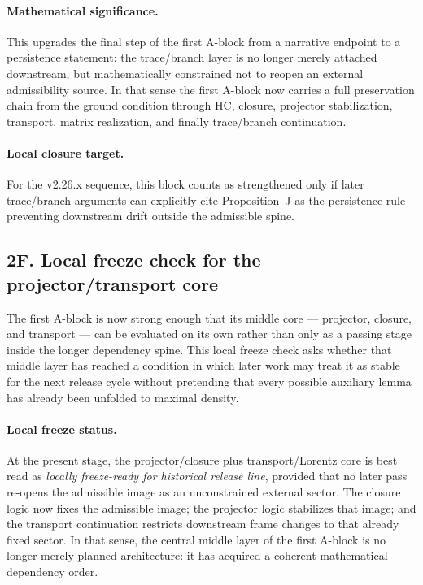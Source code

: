 \documentclass[12pt,a4paper]{article}
\DeclareRobustCommand{\QSCver}[1]{archival stage}
\renewcommand{\QSCver}[1]{historical release line}
\begin{document}
\paragraph{Mathematical significance.}
This upgrades the final step of the first A-block from a narrative endpoint to a persistence statement: the trace/branch layer is no longer merely attached downstream, but mathematically constrained not to reopen an external admissibility source. In that sense the first A-block now carries a full preservation chain from the ground condition through HC, closure, projector stabilization, transport, matrix realization, and finally trace/branch continuation.

\paragraph{Local closure target.}
For the v2.26.x sequence, this block counts as strengthened only if later trace/branch arguments can explicitly cite Proposition~J as the persistence rule preventing downstream drift outside the admissible spine.

\subsection*{2F. Local freeze check for the projector/transport core}
The first A-block is now strong enough that its middle core --- projector,
closure, and transport --- can be evaluated on its own rather than only as a
passing stage inside the longer dependency spine. This local freeze check asks
whether that middle layer has reached a condition in which later work may treat
it as stable for the next release cycle without pretending that every possible
auxiliary lemma has already been unfolded to maximal density.

\paragraph{Local freeze status.}
At the present stage, the projector/closure plus transport/Lorentz core is best
read as \emph{locally freeze-ready for \QSCver{v2.27.0}}, provided that no later pass
re-opens the admissible image as an unconstrained external sector. The closure
logic now fixes the admissible image; the projector logic stabilizes that
image; and the transport continuation restricts downstream frame changes to
that already fixed sector. In that sense, the central middle layer of the first
A-block is no longer merely planned architecture: it has acquired a coherent
mathematical dependency order.
\end{document}
